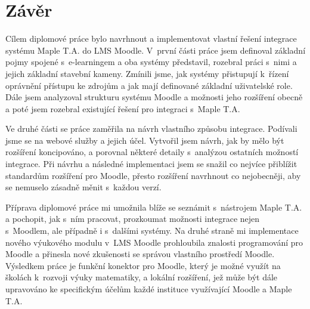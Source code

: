 \documentclass[
print,
  11pt,
  table,   
  nolof,    
  nolot,
  oneside,final
]{fithesis3}
\begin{document}
\chapter{Závěr}
Cílem diplomové práce bylo navrhnout a implementovat vlastní řešení integrace systému Maple T.A. do LMS Moodle. V~první části práce jsem definoval základní pojmy spojené s~e-learningem a oba systémy představil, rozebral práci s~nimi a jejich základní stavební kameny. Zmínili jsme, jak systémy přistupují k~řízení oprávnění přístupu ke zdrojům a jak mají definované základní uživatelské role. Dále jsem analyzoval strukturu systému Moodle a možnosti jeho rozšíření obecně a poté jsem rozebral existující řešení pro integraci s~Maple T.A. 

Ve druhé části se práce zaměřila na návrh vlastního způsobu integrace. Podívali jsme se na webové služby a jejich účel. Vytvořil jsem návrh, jak by mělo být rozšíření koncipováno, a porovnal některé detaily s~analýzou ostatních možností integrace. Při návrhu a následné implementaci jsem se snažil co nejvíce přiblížit standardům rozšíření pro Moodle, přesto rozšíření navrhnout co nejobecněji, aby se nemuselo zásadně měnit s~každou verzí.

Příprava diplomové práce mi umožnila blíže se seznámit s~nástrojem Maple T.A. a pochopit, jak s~ním pracovat, prozkoumat možnosti integrace nejen s~Moodlem, ale případně i s~dalšími systémy. Na druhé straně mi implementace nového výukového modulu v~LMS Moodle prohloubila znalosti programování pro Moodle a přinesla nové zkušenosti se správou vlastního prostředí Moodle. Výsledkem práce je funkční konektor pro Moodle, který je možné využít na školách k~rozvoji výuky matematiky, a lokální rozšíření, jež může být dále upravováno ke specifickým účelům každé instituce využívající Moodle a Maple T.A.




\printbibliography[heading=bibintoc]
\makeatletter\thesis@blocks@clear\makeatother
{} %

\makeatletter\thesis@blocks@clear\makeatother

\renewcommand{\theHchapter}{A\arabic{chapter}}
\listoffigures
\listoftables
\lstlistoflistings




\appendix %
\end{document}
